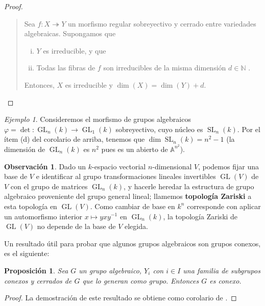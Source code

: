 \documentclass[spanish,12pt]{amsart}
\newtheorem{proposition}[theorem]{Proposición}
\theoremstyle{definition}
\newtheorem{obs}[theorem]{Observación}
\theoremstyle{remark}
\newtheorem{example}[theorem]{Ejemplo}
\numberwithin{equation}{section}
\newcommand{\afine}[1]{\mathbb{A}^{#1}}
\newcommand{\naturals}{\mathbb{N}}
\begin{document}
\begin{proof}
\begin{enumerate}[(a)]
\begin{quote}
Sea $f : X \twoheadrightarrow Y$ un morfismo regular sobreyectivo y cerrado entre variedades algebraicas. Supongamos que
\begin{enumerate}[(i)]
\item $Y$ es irreducible, y que
\item Todas las fibras de $f$ son irreducibles de la misma dimensión $d \in \naturals$ .
\end{enumerate}
Entonces, $X$ es irreducible y $\dim (X) = \dim (Y) + d$.
\end{quote}
\end{enumerate}
\end{proof}

\begin{example}
Consideremos el morfismo de grupos algebraicos $\varphi = \det : \operatorname{GL}_n (k) \to \operatorname{GL}_{1} (k)$ sobreyectivo, cuyo núcleo es $\operatorname{SL}_n (k)$. Por el ítem (d) del corolario de arriba, tenemos que $\dim \operatorname{SL}_n (k) = n^2 -1$ (la dimensión de $\operatorname{GL}_n (k)$ es $n^2$ pues es un abierto de $\afine{n^2}$).
\end{example}

\begin{obs}
Dado un $k$-espacio vectorial $n$-dimensional $V$, podemos fijar una base de $V$ e identificar al grupo transformaciones lineales invertibles $\operatorname{GL} (V)$ de $V$ con el grupo de matrices $\operatorname{GL}_n (k)$, y hacerle heredar la estructura de grupo algebraico proveniente del grupo general lineal; llamemos \textbf{topología Zariski} a esta topología en $\operatorname{GL}(V)$. Como cambiar de base en $k^n$ corresponde con aplicar un automorfismo interior $x \mapsto y x y^{-1}$ en $\operatorname{GL}_n (k)$, la topología Zariski de $\operatorname{GL} (V)$ no depende de la base de $V$ elegida.
\end{obs}

Un resultado útil para probar que algunos grupos algebraicos son grupos conexos, es el siguiente:
\begin{proposition}\label{proposition:proposicion util para probar que un grupo algebraico es conexo}
Sea $G$ un grupo algebraico, $Y_i $ con $i \in I$ una familia de subgrupos conexos y cerrados de $G$ que lo generan como grupo. Entonces $G$ es conexo.
\end{proposition}
\begin{proof}
La demostración de este resultado se obtiene como corolario de \cite[Proposición \S 7.5]{humphreys2012linearAlgebraicGroups}.
\end{proof}
\end{document}
